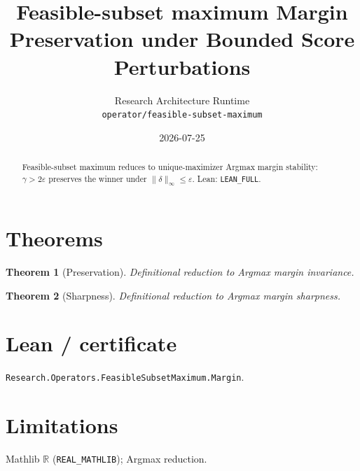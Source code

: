 \documentclass[11pt]{article}
\title{Feasible-subset maximum Margin Preservation under Bounded Score Perturbations}
\author{Research Architecture Runtime \\ \texttt{operator/feasible-subset-maximum}}
\date{2026-07-25}
\newtheorem{theorem}{Theorem}
\begin{document}
\maketitle
\begin{abstract}
Feasible-subset maximum reduces to unique-maximizer Argmax margin stability: $\gamma>2\varepsilon$
preserves the winner under $\|\delta\|_\infty\le\varepsilon$. Lean: \texttt{LEAN\_FULL}.
\end{abstract}
\section{Theorems}
\begin{theorem}[Preservation]
Definitional reduction to Argmax margin invariance.
\end{theorem}
\begin{theorem}[Sharpness]
Definitional reduction to Argmax margin sharpness.
\end{theorem}
\section{Lean / certificate}
\texttt{Research.Operators.FeasibleSubsetMaximum.Margin}.
\section{Limitations}
Mathlib $\mathbb{R}$ (\texttt{REAL\_MATHLIB}); Argmax reduction.
\end{document}
